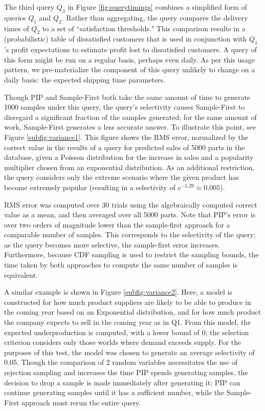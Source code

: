 The third query $Q_3$ in Figure \ref{fig:querytimings} combines a simplified form of queries $Q_1$ and $Q_2$.  Rather than aggregating, the query compares the delivery times of $Q_2$ to a set of ``satisfaction thresholds."  This comparison results in a (probabilistic) table of dissatisfied customers that is used in conjunction with $Q_1$'s profit expectations to estimate profit lost to dissatisfied customers.  A query of this form might be run on a regular basis, perhaps even daily.  As per this usage pattern, we pre-materialize the component of this query unlikely to change on a daily basis: the expected shipping time parameters.


Though PIP and Sample-First both take the same amount of time to generate 1000 samples under this query, the query's selectivity causes Sample-First to disregard a significant fraction of the samples generated; for the same amount of work, Sample-First generates a less accurate answer.  To illustrate this point, see Figure \ref{subfig:variance1}.  This figure shows the RMS error, normalized by the correct value in the results of a query for predicted sales of 5000 parts in the database, given a Poisson distribution for the increase in sales and a popularity multiplier chosen from an exponential distribution.  As an additional restriction, the query considers only the extreme scenario where the given product has become extremely popular (resulting in a selectivity of $e^{-5.29} \approx 0.005$).  

RMS error was computed over 30 trials using the algebraically computed correct value as a mean, and then averaged over all 5000 parts.  Note that PIP's error is over two orders of magnitude lower than the sample-first approach for a comparable number of samples.  This corresponds to the selectivity of the query; as the query becomes more selective, the sample-first error increases.  Furthermore, because CDF sampling is used to restrict the sampling bounds, the time taken by both approaches to compute the same number of samples is equivalent.

A similar example is shown in Figure \ref{subfig:variance2}.  Here, a model is constructed for how much product suppliers are likely to be able to produce in the coming year based on an Exponential distribution, and for how much product the company expects to sell in the coming year as in Q1.  From this model, the expected underproduction is computed, with a lower bound of 0; the selection criterion considers only those worlds where demand exceeds supply.  For the purposes of this test, the model was chosen to generate an average selectivity of 0.05.  Though the comparison of 2 random variables necessitates the use of rejection sampling and increases the time PIP spends generating samples, the decision to drop a sample is made immediately after generating it; PIP can continue generating samples until it has a sufficient number, while the Sample-First approach must rerun the entire query.

